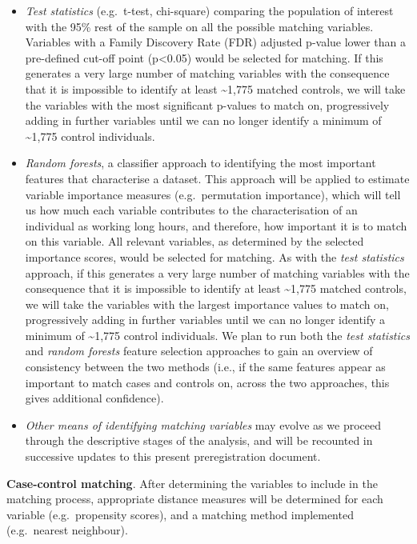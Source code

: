 \documentclass[
  english,
  man, donotrepeattitle,floatsintext]{apa6}
\begin{document}
\begin{itemize}
\item
  \emph{Test statistics} (e.g.~t-test, chi-square) comparing the population of interest with the 95\% rest of the sample on all the possible matching variables. Variables with a Family Discovery Rate (FDR) adjusted p-value lower than a pre-defined cut-off point (p\textless0.05) would be selected for matching. If this generates a very large number of matching variables with the consequence that it is impossible to identify at least \textasciitilde1,775 matched controls, we will take the variables with the most significant p-values to match on, progressively adding in further variables until we can no longer identify a minimum of \textasciitilde1,775 control individuals.
\item
  \emph{Random forests}, a classifier approach to identifying the most important features that characterise a dataset. This approach will be applied to estimate variable importance measures (e.g.~permutation importance), which will tell us how much each variable contributes to the characterisation of an individual as working long hours, and therefore, how important it is to match on this variable. All relevant variables, as determined by the selected importance scores, would be selected for matching. As with the \emph{test statistics} approach, if this generates a very large number of matching variables with the consequence that it is impossible to identify at least \textasciitilde1,775 matched controls, we will take the variables with the largest importance values to match on, progressively adding in further variables until we can no longer identify a minimum of \textasciitilde1,775 control individuals.
  We plan to run both the \emph{test statistics} and \emph{random forests} feature selection approaches to gain an overview of consistency between the two methods (i.e., if the same features appear as important to match cases and controls on, across the two approaches, this gives additional confidence).
\item
  \emph{Other means of identifying matching variables} may evolve as we proceed through the descriptive stages of the analysis, and will be recounted in successive updates to this present preregistration document.
\end{itemize}

\textbf{Case-control matching}. After determining the variables to include in the matching process, appropriate distance measures will be determined for each variable (e.g.~propensity scores), and a matching method implemented (e.g.~nearest neighbour).
\end{document}

